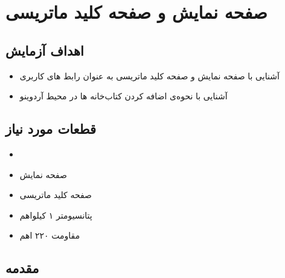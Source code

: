\section{صفحه نمایش  و صفحه کلید ماتریسی}

\subsection{اهداف آزمایش}
\begin{itemize}
    \item آشنایی با صفحه نمایش  و صفحه کلید ماتریسی به عنوان رابط های کاربری
    \item آشنایی با نحوه‌ی اضافه کردن کتاب‌خانه ها در محیط آردوینو
\end{itemize}

\subsection{قطعات مورد نیاز}
\begin{itemize}
    \item {}
    \item صفحه نمایش 
    \item صفحه کلید ماتریسی
    \item پتانسیومتر ۱ کیلواهم 
    \item مقاومت ۲۲۰ اهم
\end{itemize}
\pagebreak

\subsection{مقدمه}

